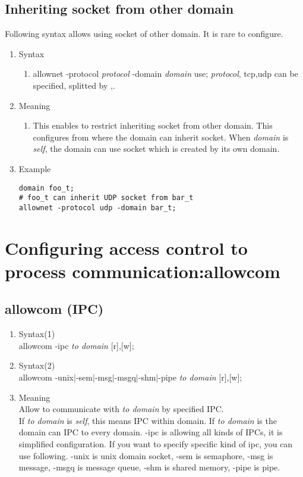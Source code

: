 \documentclass{article}
\begin{document}
\subsection{Inheriting socket from other domain}\label{sec:socket}
Following syntax allows using socket of other domain. It is rare to configure.
\begin{enumerate}
 \item  Syntax 
	\begin{enumerate}
	 \item allownet -protocol {\it protocol}  -domain {\it domain} use;
	       {\it protocol}, tcp,udp can be specified, splitted by ,.
	\end{enumerate}

 \item Meaning\\
	\begin{enumerate}
	 \item This enables to restrict inheriting socket from other
	       domain. This configures from where the domain can
	       inherit socket. When {\it domain} is {\it self}, the domain can
	       use socket which is created by its own domain. 
	\end{enumerate}
\item Example
\begin{verbatim}
domain foo_t;
# foo_t can inherit UDP socket from bar_t
allownet -protocol udp -domain bar_t; 
\end{verbatim}
\end{enumerate}
\section{Configuring access control to process communication:allowcom}
\subsection{allowcom (IPC)}
\begin{enumerate}
 \item Syntax(1)\\
       allowcom -ipc {\it to domain} [r],[w];
 \item Syntax(2)\\
       allowcom -unix$\mid$-sem$\mid$-msg$\mid$-msgq$\mid$-shm$\mid$-pipe {\it to
       domain} [r],[w];
 \item Meaning\\
       Allow to communicate with {\it  to domain } by specified IPC.\\
       If {\it to domain } is {\it self}, this means IPC within
       domain. If {\it  to domain } is {\it *} the domain can IPC
       to every domain.
       -ipc is allowing all kinds of IPCs, it is simplified
       configuration. If you want to specify specific kind of ipc, you
       can use following.      
       -unix is unix domain socket, -sem is semaphore, -msg is message,
       -msgq is message queue, -shm is shared memory, -pipe is pipe.
\end{enumerate}
\end{document}
